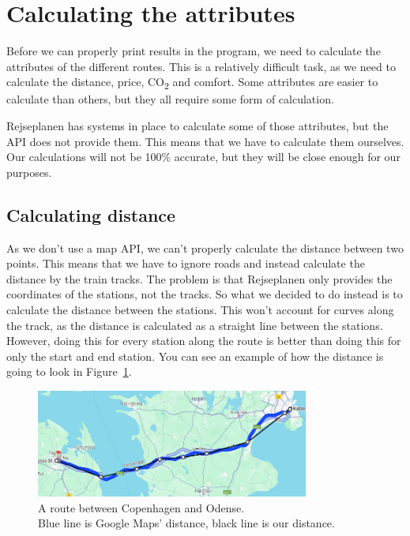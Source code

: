 \section{Calculating the attributes}\label{sec:calculations}

Before we can properly print results in the program, we need to calculate the attributes of the different routes.
This is a relatively difficult task, as we need to calculate the distance, price, \unit{CO_{2}} and comfort.
Some attributes are easier to calculate than others, but they all require some form of calculation.

Rejseplanen has systems in place to calculate some of those attributes, but the API does not provide them.
This means that we have to calculate them ourselves.
Our calculations will not be 100\% accurate, but they will be close enough for our purposes.

\subsection{Calculating distance}\label{subsec:calculating-distance}

As we don't use a map API, we can't properly calculate the distance between two points.
This means that we have to ignore roads and instead calculate the distance by the train tracks.
The problem is that Rejseplanen only provides the coordinates of the stations, not the tracks.
So what we decided to do instead is to calculate the distance between the stations.
This won't account for curves along the track, as the distance is calculated as a straight line between the stations.
However, doing this for every station along the route is better than doing this for only the start and end station.
You can see an example of how the distance is going to look in Figure~\ref{fig:image-google-maps-distance-calculation}.

\begin{figure}[H]
    \centering
    \includegraphics[width=0.8\textwidth]{images/google-maps-distance-calculation.jpg}
    \caption{A route between Copenhagen and Odense. \\ Blue line is Google Maps' distance, black line is our distance.}
    \label{fig:image-google-maps-distance-calculation}
\end{figure}

